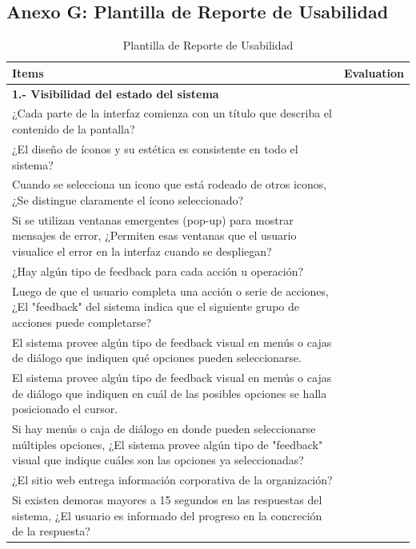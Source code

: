 \documentclass[stu, 12pt, letterpaper, donotrepeattitle, floatsintext, natbib]{apa7}
\begin{document}
\subsection{Anexo G: Plantilla de Reporte de Usabilidad}
\begin{longtable}{|>{\raggedright\arraybackslash}p{10cm}|>{\centering\arraybackslash}p{3cm}|}
    \caption{Plantilla de Reporte de Usabilidad} \label{tab:reporte_usabilidad} \\
    \hline
    \textbf{Items} & \textbf{Evaluation} \\ \hline
    
    \textbf{1.- Visibilidad del estado del sistema} & \\ \hline
    ¿Cada parte de la interfaz comienza con un título que describa el contenido de la pantalla? & \\ \hline
    ¿El diseño de íconos y su estética es consistente en todo el sistema? & \\ \hline
    Cuando se selecciona un icono que está rodeado de otros iconos, ¿Se distingue claramente el ícono seleccionado? & \\ \hline
    Si se utilizan ventanas emergentes (pop-up) para mostrar mensajes de error, ¿Permiten esas ventanas que el usuario visualice el error en la interfaz cuando se despliegan? & \\ \hline
    ¿Hay algún tipo de feedback para cada acción u operación? & \\ \hline
    Luego de que el usuario completa una acción o serie de acciones, ¿El "feedback" del sistema indica que el siguiente grupo de acciones puede completarse? & \\ \hline
    El sistema provee algún tipo de feedback visual en menús o cajas de diálogo que indiquen qué opciones pueden seleccionarse. & \\ \hline
    El sistema provee algún tipo de feedback visual en menús o cajas de diálogo que indiquen en cuál de las posibles opciones se halla posicionado el cursor. & \\ \hline
    Si hay menús o caja de diálogo en donde pueden seleccionarse múltiples opciones, ¿El sistema provee algún tipo de "feedback" visual que indique cuáles son las opciones ya seleccionadas? & \\ \hline
    ¿El sitio web entrega información corporativa de la organización? & \\ \hline
    Si existen demoras mayores a 15 segundos en las respuestas del sistema, ¿El usuario es informado del progreso en la concreción de la respuesta? & \\ \hline

\end{longtable}
\end{document}
